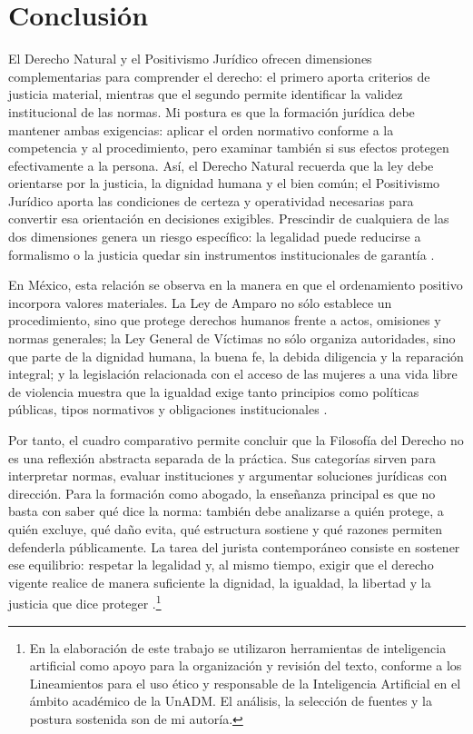 \documentclass[
	spanish, %
	letterpaper, oneside
]{article}
\begin{document}
\section{Conclusión}

El Derecho Natural y el Positivismo Jurídico ofrecen dimensiones complementarias para comprender el derecho: el primero aporta criterios de justicia material, mientras que el segundo permite identificar la validez institucional de las normas. Mi postura es que la formación jurídica debe mantener ambas exigencias: aplicar el orden normativo conforme a la competencia y al procedimiento, pero examinar también si sus efectos protegen efectivamente a la persona. Así, el Derecho Natural recuerda que la ley debe orientarse por la justicia, la dignidad humana y el bien común; el Positivismo Jurídico aporta las condiciones de certeza y operatividad necesarias para convertir esa orientación en decisiones exigibles. Prescindir de cualquiera de las dos dimensiones genera un riesgo específico: la legalidad puede reducirse a formalismo o la justicia quedar sin instrumentos institucionales de garantía \citep{finnisEstudiosTeoriaDerecho2017,ruizrodriguezFilosofiaDerecho2009}.

En México, esta relación se observa en la manera en que el ordenamiento positivo incorpora valores materiales. La Ley de Amparo no sólo establece un procedimiento, sino que protege derechos humanos frente a actos, omisiones y normas generales; la Ley General de Víctimas no sólo organiza autoridades, sino que parte de la dignidad humana, la buena fe, la debida diligencia y la reparación integral; y la legislación relacionada con el acceso de las mujeres a una vida libre de violencia muestra que la igualdad exige tanto principios como políticas públicas, tipos normativos y obligaciones institucionales \citep{LeyAmparoReglamentaria,LeyGeneralVictimas,franzoniacevedoLeyGeneralAcceso2017}.

Por tanto, el cuadro comparativo permite concluir que la Filosofía del Derecho no es una reflexión abstracta separada de la práctica. Sus categorías sirven para interpretar normas, evaluar instituciones y argumentar soluciones jurídicas con dirección. Para la formación como abogado, la enseñanza principal es que no basta con saber qué dice la norma: también debe analizarse a quién protege, a quién excluye, qué daño evita, qué estructura sostiene y qué razones permiten defenderla públicamente. La tarea del jurista contemporáneo consiste en sostener ese equilibrio: respetar la legalidad y, al mismo tiempo, exigir que el derecho vigente realice de manera suficiente la dignidad, la igualdad, la libertad y la justicia que dice proteger \citep{ruizrodriguezFilosofiaDerecho2009,lovonManualPracticoFilosofia2020}.\footnote{En la elaboración de este trabajo se utilizaron herramientas de inteligencia artificial como apoyo para la organización y revisión del texto, conforme a los Lineamientos para el uso ético y responsable de la Inteligencia Artificial en el ámbito académico de la UnADM. El análisis, la selección de fuentes y la postura sostenida son de mi autoría.}



\end{document}
